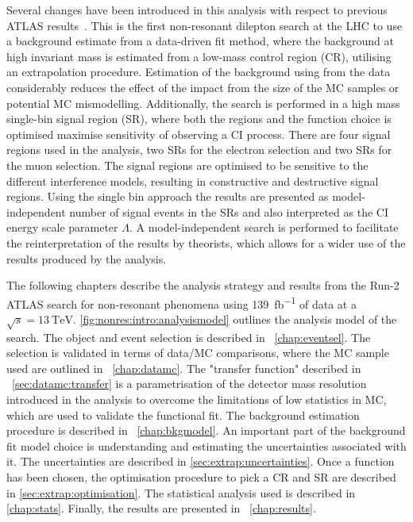 Several changes have been introduced in this analysis with respect to previous ATLAS results~\cite{EXOT-2016-05}. This is the first non-resonant dilepton search at the LHC to use a background estimate from a data-driven fit method, where the background at high invariant mass is estimated from a low-mass control region (CR), utilising an extrapolation procedure. Estimation of the background using from the data considerably reduces the effect of the impact from the size of the MC samples or potential MC mismodelling. Additionally, the search is performed in a high mass single-bin signal region (SR), where both the regions and the function choice is optimised maximise sensitivity of observing a CI process. There are four signal regions used in the analysis, two SRs for the electron selection and two SRs for the muon selection. The signal regions are optimised to be sensitive to the different interference models, resulting in constructive and destructive signal regions. Using the single bin approach the results are presented as  model-independent number of signal events in the SRs and also interpreted as the CI energy scale parameter $\Lambda$. A model-independent search is performed to facilitate the reinterpretation of the results by theorists, which allows for a wider use of the results produced by the analysis. 

The following chapters describe the analysis strategy and results from the Run-2 ATLAS search for non-resonant phenomena using \SI{139}{\femto\barn^{-1}} of data at a $\sqrt{s}=\SI{13}{\tera\electronvolt}$. \cref{fig:nonres:intro:analysismodel} outlines the analysis model of the search. The object and event selection is described in ~\cref{chap:eventsel}. The selection is validated in terms of data/MC comparisons, where the MC sample used are outlined in ~\cref{chap:datamc}. The "transfer function" described in ~\cref{sec:datamc:transfer} is a parametrisation of the detector mass resolution introduced in the analysis to overcome the limitations of low statistics in MC, which are used to validate the functional fit. The background estimation procedure is described in ~\cref{chap:bkgmodel}. An important part of the background fit model choice is understanding and estimating the uncertainties associated with it. The uncertainties are described in \cref{sec:extrap:uncertainties}. Once a function has been chosen, the optimisation procedure to pick a CR and SR are described in \cref{sec:extrap:optimisation}. The statistical analysis used is described in \cref{chap:stats}. Finally, the results are presented in ~\cref{chap:results}. 

